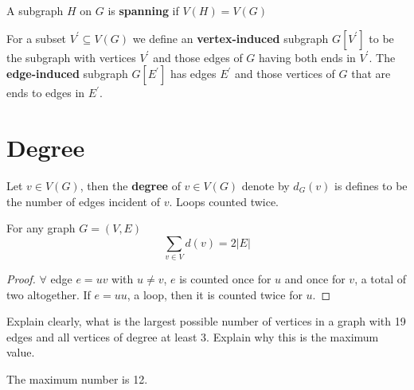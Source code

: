 				\begin{definition}[Spanning]
					A subgraph $H$ on $G$ is \textbf{spanning} if $V(H) = V(G)$
				\end{definition}

				\begin{definition}
					For a subset $V^\prime \subseteq V(G)$ we define an \textbf{vertex-induced} subgraph $G[V^\prime ]$ to be the subgraph with vertices $V^\prime$ and those edges of $G$ having both ends in $V^\prime$. The \textbf{edge-induced} subgraph $G[E^\prime ]$ has edges $E^\prime$ and those vertices of $G$ that are ends to edges in $E^\prime$.
				\end{definition}


			\section{Degree}
				\begin{definition}[Degree]
					Let $v\in V(G)$, then the \textbf{degree} of $v\in V(G)$ denote by $d_G(v)$ is defines to be the number of edges incident of $v$. Loops counted twice.
				\end{definition}

				\begin{theorem}
					For any graph $G=(V, E)$
					\begin{equation}
						\sum_{v\in V}d(v) = 2|E|
					\end{equation}
				\end{theorem}

				\begin{proof}
					$\forall$ edge $e=uv$ with $u \neq v$, $e$ is counted once for $u$ and once for $v$, a total of two altogether. If $e=uu$, a loop, then it is counted twice for $u$.
				\end{proof}

				\begin{problem}
					Explain clearly, what is the largest possible number of vertices in a graph with 19 edges and all vertices of degree at least 3. Explain why this is the maximum value.
				\end{problem}

				\begin{solution}
					The maximum number is 12.
				\end{solution}

